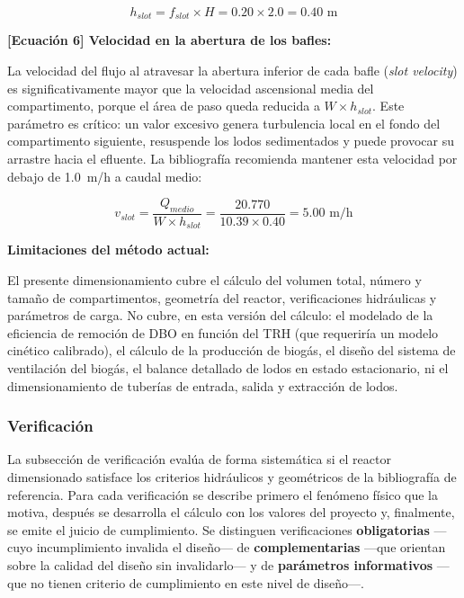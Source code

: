 \documentclass[12pt,a4paper]{article}
\begin{document}
\begin{equation}
h_{slot} = f_{slot} \times H = 0.20 \times 2.0 = 0.40 \text{ m}
\end{equation}

\textbf{[Ecuación 6] Velocidad en la abertura de los bafles:}

La velocidad del flujo al atravesar la abertura inferior de cada bafle (\textit{slot velocity}) es significativamente mayor que la velocidad ascensional media del compartimento, porque el área de paso queda reducida a $W \times h_{slot}$. Este parámetro es crítico: un valor excesivo genera turbulencia local en el fondo del compartimento siguiente, resuspende los lodos sedimentados y puede provocar su arrastre hacia el efluente. La bibliografía recomienda mantener esta velocidad por debajo de 1.0~m/h a caudal medio:

\begin{equation}
v_{slot} = \frac{Q_{medio}}{W \times h_{slot}} = \frac{20.770}{10.39 \times 0.40} = 5.00 \text{ m/h}
\end{equation}

\textbf{Limitaciones del método actual:}

El presente dimensionamiento cubre el cálculo del volumen total, número y tamaño de compartimentos, geometría del reactor, verificaciones hidráulicas y parámetros de carga. No cubre, en esta versión del cálculo: el modelado de la eficiencia de remoción de DBO en función del TRH (que requeriría un modelo cinético calibrado), el cálculo de la producción de biogás, el diseño del sistema de ventilación del biogás, el balance detallado de lodos en estado estacionario, ni el dimensionamiento de tuberías de entrada, salida y extracción de lodos.

\subsubsection{Verificación}

La subsección de verificación evalúa de forma sistemática si el reactor dimensionado satisface los criterios hidráulicos y geométricos de la bibliografía de referencia. Para cada verificación se describe primero el fenómeno físico que la motiva, después se desarrolla el cálculo con los valores del proyecto y, finalmente, se emite el juicio de cumplimiento. Se distinguen verificaciones \textbf{obligatorias} ---cuyo incumplimiento invalida el diseño--- de \textbf{complementarias} ---que orientan sobre la calidad del diseño sin invalidarlo--- y de \textbf{parámetros informativos} ---que no tienen criterio de cumplimiento en este nivel de diseño---.
\end{document}
